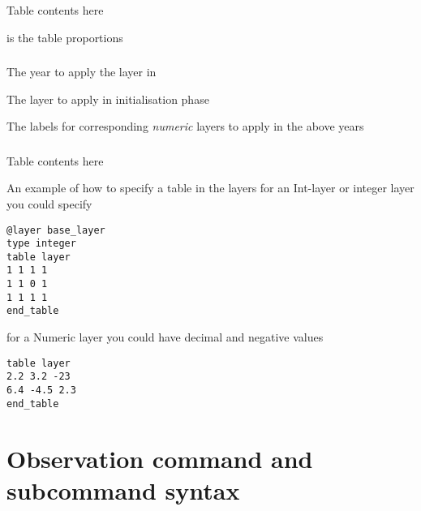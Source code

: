 \subsubsection[Numeric]{}
 {}
Table contents here\\
 {}

 {is the table proportions}

\subsubsection[Numeric Meta layer]{}
 {The year to apply the layer in}

 {The layer to apply in initialisation phase}

 {The labels for corresponding \emph{numeric} layers to apply in the above years}

\subsubsection[Integer]{}
 {}
Table contents here\\
 {}




An example of how to specify a table in the layers for an Int-layer or integer layer you could specify

{\small{\begin{verbatim}
@layer base_layer
type integer		
table layer
1 1 1 1
1 1 0 1
1 1 1 1
end_table
\end{verbatim}}}

for a Numeric layer you could have decimal and negative values
{\small{\begin{verbatim}
table layer
2.2 3.2 -23
6.4 -4.5 2.3
end_table
\end{verbatim}}}

\section{Observation command and subcommand syntax\label{sec:observation-syntax}}

